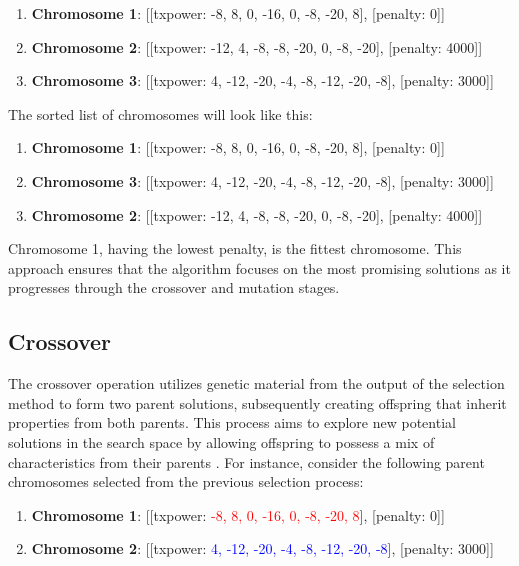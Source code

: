 \begin{enumerate}
    \item \textbf{Chromosome 1}: [[txpower: -8, 8, 0, -16, 0, -8, -20, 8], [penalty: 0]]
    \item \textbf{Chromosome 2}: [[txpower: -12, 4, -8, -8, -20, 0, -8, -20], [penalty: 4000]]
    \item \textbf{Chromosome 3}: [[txpower: 4, -12, -20, -4, -8, -12, -20, -8], [penalty: 3000]]
\end{enumerate}

The sorted list of chromosomes will look like this:

\begin{enumerate}
    \item \textbf{Chromosome 1}: [[txpower: -8, 8, 0, -16, 0, -8, -20, 8], [penalty: 0]]
    \item \textbf{Chromosome 3}: [[txpower: 4, -12, -20, -4, -8, -12, -20, -8], [penalty: 3000]]
    \item \textbf{Chromosome 2}: [[txpower: -12, 4, -8, -8, -20, 0, -8, -20], [penalty: 4000]]
\end{enumerate}

Chromosome 1, having the lowest penalty, is the fittest chromosome. This approach ensures that the algorithm focuses on the most promising solutions as it progresses through the crossover and mutation stages.

\subsection{Crossover}

The crossover operation utilizes genetic material from the output of the selection method to form two parent solutions, subsequently creating offspring that inherit properties from both parents. This process aims to explore new potential solutions in the search space by allowing offspring to possess a mix of characteristics from their parents \cite{lambora2019genetic}. For instance, consider the following parent chromosomes selected from the previous selection process:

\begin{enumerate}
    \item \textbf{Chromosome 1}: [[txpower: \textcolor{red}{-8, 8, 0, -16, 0, -8, -20, 8}], [penalty: 0]]
    \item \textbf{Chromosome 2}: [[txpower: \textcolor{blue}{ 4, -12, -20, -4, -8, -12, -20, -8}], [penalty: 3000]]
\end{enumerate}

